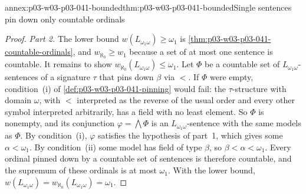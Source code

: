 \begin{annexitem}{annex:p03-w03-p03-041-bounded}{thm:p03-w03-p03-041-bounded}{Single sentences pin down only countable ordinals}
\begin{proof}
\emph{Part 2.} The lower bound \(w(L_{\omega_1\omega})\geq\omega_1\) is
\cref{thm:p03-w03-p03-041-countable-ordinals}, and
\(w_{\aleph_0}\geq w_1\) because a set of at most one sentence is
countable. It remains to show
\(w_{\aleph_0}(L_{\omega_1\omega})\leq\omega_1\). Let \(\Phi\) be a
countable set of \(L_{\omega_1\omega}\)-sentences of a signature \(\tau\)
that pins down \(\beta\) via \(<\). If \(\Phi\) were empty, condition~(i)
of \cref{def:p03-w03-p03-041-pinning} would fail: the \(\tau\)-structure
with domain \(\omega\), with \(<\) interpreted as the reverse of the usual
order and every other symbol interpreted arbitrarily, has a field with no
least element. So \(\Phi\) is nonempty, and its conjunction
\(\varphi=\bigwedge\Phi\) is an \(L_{\omega_1\omega}\)-sentence with the
same models as \(\Phi\). By condition~(i), \(\varphi\) satisfies the
hypothesis of part~1, which gives some \(\alpha<\omega_1\). By
condition~(ii) some model has field of type \(\beta\), so
\(\beta<\alpha<\omega_1\). Every ordinal pinned down by a countable set of
sentences is therefore countable, and the supremum of these ordinals is at
most \(\omega_1\). With the lower bound,
\(w(L_{\omega_1\omega})=w_{\aleph_0}(L_{\omega_1\omega})=\omega_1\).
\end{proof}
\end{annexitem}
